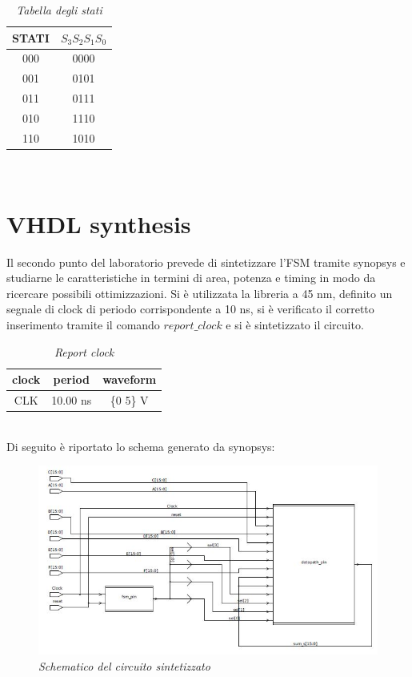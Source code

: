 \begin{table}[!h]\footnotesize
	\centering
	\begin{tabular}{|c|c|}
		\hline
		\textbf{STATI} & \textbf{$S_{3}S_{2}S_{1}S_{0}$}\\
		\hline
		000 & 0000\\
		\hline
		001 &0101 \\
		\hline
		011& 0111\\
		\hline
		010& 1110\\
		\hline
		110& 1010\\
		\hline 
	\end{tabular}
	\caption{\textit{Tabella degli stati}}
	\label{tab2}
\end{table} \\
\section{VHDL synthesis}
Il secondo punto del laboratorio prevede di sintetizzare l’FSM tramite synopsys e studiarne le caratteristiche in termini di area, potenza e timing in modo da ricercare possibili ottimizzazioni. Si è utilizzata la libreria a 45 nm, definito un segnale di clock di periodo corrispondente a 10 ns, si è verificato il corretto inserimento tramite il comando \emph{$report\_clock$} e si è sintetizzato il circuito.\\
\begin{table}[!h]\footnotesize
	\centering
	\begin{tabular}{|c|c|c|}
		\hline
		\textbf{clock} & \textbf{period} & \textbf{waveform}\\
		\hline
		CLK & 10.00 ns & \{0 5\} V\\
		\hline
	\end{tabular}
	\caption{\textit{Report clock}}
\label{clock_report}
\end{table} \\
Di seguito è riportato lo schema generato da synopsys:
\begin{figure}[!htb]
	\centering
	\includegraphics[scale=0.6]{immagini/schemlab2_2}
	\caption{\textit{Schematico del circuito sintetizzato}}
	\label{datapath}
\end{figure} \\
